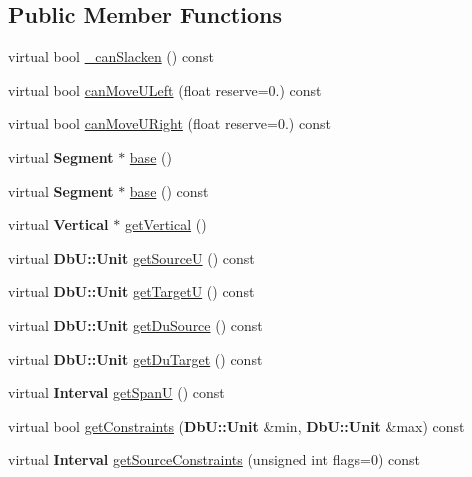 \subsection*{Public Member Functions}
\begin{DoxyCompactItemize}
\item 
virtual bool \hyperlink{classKatabatic_1_1AutoVertical_ab0c6fe24404afe19268a7b796fa74bec}{\-\_\-can\-Slacken} () const 
\item 
virtual bool \hyperlink{classKatabatic_1_1AutoVertical_aa9e85f38a842d1966eb72afccb446676}{can\-Move\-U\-Left} (float reserve=0.) const 
\item 
virtual bool \hyperlink{classKatabatic_1_1AutoVertical_a7559a856712400a9325665842e0bcd64}{can\-Move\-U\-Right} (float reserve=0.) const 
\item 
virtual {\bf Segment} $\ast$ \hyperlink{classKatabatic_1_1AutoVertical_a9e651c17b47f82166a02865c9296a2df}{base} ()
\item 
virtual {\bf Segment} $\ast$ \hyperlink{classKatabatic_1_1AutoVertical_adcd751c3ec393fabdef5ede0ffff6f2d}{base} () const 
\item 
virtual {\bf Vertical} $\ast$ \hyperlink{classKatabatic_1_1AutoVertical_ab6a809b6f3ef3cf5385fa35580e31e7a}{get\-Vertical} ()
\item 
virtual {\bf Db\-U\-::\-Unit} \hyperlink{classKatabatic_1_1AutoVertical_a3932d5ce9094ead510e4e33bd4e78e1a}{get\-Source\-U} () const 
\item 
virtual {\bf Db\-U\-::\-Unit} \hyperlink{classKatabatic_1_1AutoVertical_a8e5f2a51f56c6bdb74024ac77c08a22a}{get\-Target\-U} () const 
\item 
virtual {\bf Db\-U\-::\-Unit} \hyperlink{classKatabatic_1_1AutoVertical_a44998a5f0d71597006fe4f3ffed8e3d1}{get\-Du\-Source} () const 
\item 
virtual {\bf Db\-U\-::\-Unit} \hyperlink{classKatabatic_1_1AutoVertical_a4f505a59109fc6087696f483ccc7f9dc}{get\-Du\-Target} () const 
\item 
virtual {\bf Interval} \hyperlink{classKatabatic_1_1AutoVertical_a9409a4b64c21fa8b1517149728f0a4c1}{get\-Span\-U} () const 
\item 
virtual bool \hyperlink{classKatabatic_1_1AutoVertical_aff207f4cc3c3682ed57369fdfe157d2d}{get\-Constraints} ({\bf Db\-U\-::\-Unit} \&min, {\bf Db\-U\-::\-Unit} \&max) const 
\item 
virtual {\bf Interval} \hyperlink{classKatabatic_1_1AutoVertical_a3c24695921b612a57c5ac60ff0aa3878}{get\-Source\-Constraints} (unsigned int flags=0) const 

\end{DoxyCompactItemize}
